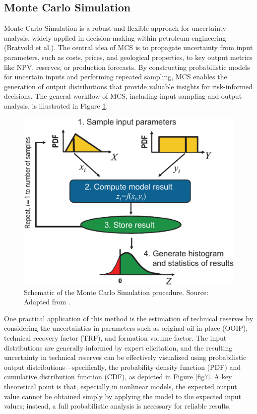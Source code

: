 \documentclass[pdflatex,sn-basic]{sn-jnl}%
\theoremstyle{thmstyleone}%
\theoremstyle{thmstyletwo}%
\theoremstyle{thmstylethree}%
\begin{document}
\subsection{Monte Carlo Simulation}\label{subsec42}

Monte Carlo Simulation is a robust and flexible approach for uncertainty analysis, widely applied in decision-making within petroleum engineering (Bratvold et al.). The central idea of MCS is to propagate uncertainty from input parameters, such as costs, prices, and geological properties, to key output metrics like NPV, reserves, or production forecasts. By constructing probabilistic models for uncertain inputs and performing repeated sampling, MCS enables the generation of output distributions that provide valuable insights for risk-informed decisions. The general workflow of MCS, including input sampling and output analysis, is illustrated in Figure \ref{fig6}.

\begin{figure}[H]
\centering
\begin{minipage}{0.75\textwidth}
  \includegraphics[width=\textwidth]{schematic_MCS.eps}
  \caption{Schematic of the Monte Carlo Simulation procedure. Source: Adapted from \cite{ref24}.}
  \label{fig6}
\end{minipage}
\end{figure}

One practical application of this method is the estimation of technical reserves by considering the uncertainties in parameters such as original oil in place (OOIP), technical recovery factor (TRF), and formation volume factor. The input distributions are generally informed by expert elicitation, and the resulting uncertainty in technical reserves can be effectively visualized using probabilistic output distributions—specifically, the probability density function (PDF) and cumulative distribution function (CDF), as depicted in Figure \ref{fig7}. A key theoretical point is that, especially in nonlinear models, the expected output value cannot be obtained simply by applying the model to the expected input values; instead, a full probabilistic analysis is necessary for reliable results.
\end{document}
